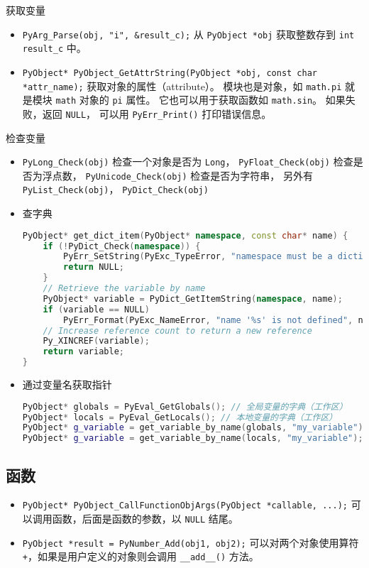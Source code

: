 获取变量
\begin{itemize}
\item \verb`PyArg_Parse(obj, "i", &result_c);` 从 \verb`PyObject *obj` 获取整数存到 \verb`int result_c` 中。
\item \verb`PyObject* PyObject_GetAttrString(PyObject *obj, const char *attr_name);` 获取对象的属性（attribute）。 模块也是对象，如 \verb`math.pi` 就是模块 \verb`math` 对象的 \verb`pi` 属性。 它也可以用于获取函数如 \verb`math.sin`。 如果失败，返回 \verb`NULL`， 可以用 \verb`PyErr_Print()` 打印错误信息。
\end{itemize}

检查变量
\begin{itemize}
\item \verb`PyLong_Check(obj)` 检查一个对象是否为 \verb`Long`， \verb`PyFloat_Check(obj)` 检查是否为浮点数， \verb`PyUnicode_Check(obj)` 检查是否为字符串， 另外有 \verb`PyList_Check(obj)`， \verb`PyDict_Check(obj)`
\item 查字典
\begin{lstlisting}[language=cpp]
PyObject* get_dict_item(PyObject* namespace, const char* name) {
    if (!PyDict_Check(namespace)) {
        PyErr_SetString(PyExc_TypeError, "namespace must be a dictionary");
        return NULL;
    }
    // Retrieve the variable by name
    PyObject* variable = PyDict_GetItemString(namespace, name);
    if (variable == NULL)
        PyErr_Format(PyExc_NameError, "name '%s' is not defined", name);
    // Increase reference count to return a new reference
    Py_XINCREF(variable);
    return variable;
}
\end{lstlisting}
\item 通过变量名获取指针
\begin{lstlisting}[language=cpp]
PyObject* globals = PyEval_GetGlobals(); // 全局变量的字典（工作区）
PyObject* locals = PyEval_GetLocals(); // 本地变量的字典（工作区）
PyObject* g_variable = get_variable_by_name(globals, "my_variable");
PyObject* g_variable = get_variable_by_name(locals, "my_variable");
\end{lstlisting}
\end{itemize}


\subsection{函数}
\begin{itemize}
\item \verb`PyObject* PyObject_CallFunctionObjArgs(PyObject *callable, ...);` 可以调用函数，后面是函数的参数，以 \verb`NULL` 结尾。
\item \verb`PyObject *result = PyNumber_Add(obj1, obj2);` 可以对两个对象使用算符 \verb`+`，如果是用户定义的对象则会调用 \verb`__add__()` 方法。
\end{itemize}
